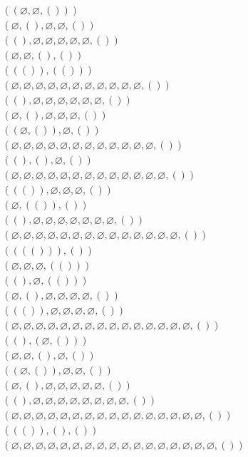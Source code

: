 \documentclass[12pt]{article}
\def\qua{()}
\newcommand{\quat}[1]{\left( #1 \right)}
\def\nul{\varnothing}
\begin{document}
\begin{align*}
&\quat{\quat{\nul,\nul,\qua}}\\
&\quat{\nul,\qua,\nul,\nul,\qua}\\
&\quat{\qua,\nul,\nul,\nul,\nul,\nul,\qua}\\
&\quat{\nul,\nul,\qua,\qua}\\
&\quat{\quat{\qua},\quat{\qua}}\\
&\quat{\nul,\nul,\nul,\nul,\nul,\nul,\nul,\nul,\nul,\nul,\nul,\qua}\\
&\quat{\qua,\nul,\nul,\nul,\nul,\nul,\nul,\qua}\\
&\quat{\nul,\qua,\nul,\nul,\nul,\qua}\\
&\quat{\quat{\nul,\qua},\nul,\qua}\\
&\quat{\nul,\nul,\nul,\nul,\nul,\nul,\nul,\nul,\nul,\nul,\nul,\nul,\qua}\\
&\quat{\qua,\qua,\nul,\qua}\\
&\quat{\nul,\nul,\nul,\nul,\nul,\nul,\nul,\nul,\nul,\nul,\nul,\nul,\nul,\qua}\\
&\quat{\quat{\qua},\nul,\nul,\nul,\qua}\\
&\quat{\nul,\quat{\qua},\qua}\\
&\quat{\qua,\nul,\nul,\nul,\nul,\nul,\nul,\nul,\qua}\\
&\quat{\nul,\nul,\nul,\nul,\nul,\nul,\nul,\nul,\nul,\nul,\nul,\nul,\nul,\nul,\qua}\\
&\quat{\quat{\quat{\qua}},\qua}\\
&\quat{\nul,\nul,\nul,\quat{\qua}}\\
&\quat{\qua,\nul,\quat{\qua}}\\
&\quat{\nul,\qua,\nul,\nul,\nul,\nul,\qua}\\
&\quat{\quat{\qua},\nul,\nul,\nul,\nul,\qua}\\
&\quat{\nul,\nul,\nul,\nul,\nul,\nul,\nul,\nul,\nul,\nul,\nul,\nul,\nul,\nul,\nul,\qua}\\
&\quat{\qua,\quat{\nul,\qua}}\\
&\quat{\nul,\nul,\qua,\nul,\qua}\\
&\quat{\quat{\nul,\qua},\nul,\nul,\qua}\\
&\quat{\nul,\qua,\nul,\nul,\nul,\nul,\nul,\qua}\\
&\quat{\qua,\nul,\nul,\nul,\nul,\nul,\nul,\nul,\nul,\qua}\\
&\quat{\nul,\nul,\nul,\nul,\nul,\nul,\nul,\nul,\nul,\nul,\nul,\nul,\nul,\nul,\nul,\nul,\qua}\\
&\quat{\quat{\qua},\qua,\qua}\\
&\quat{\nul,\nul,\nul,\nul,\nul,\nul,\nul,\nul,\nul,\nul,\nul,\nul,\nul,\nul,\nul,\nul,\nul,\qua}\\

\end{align*}
\end{document}
